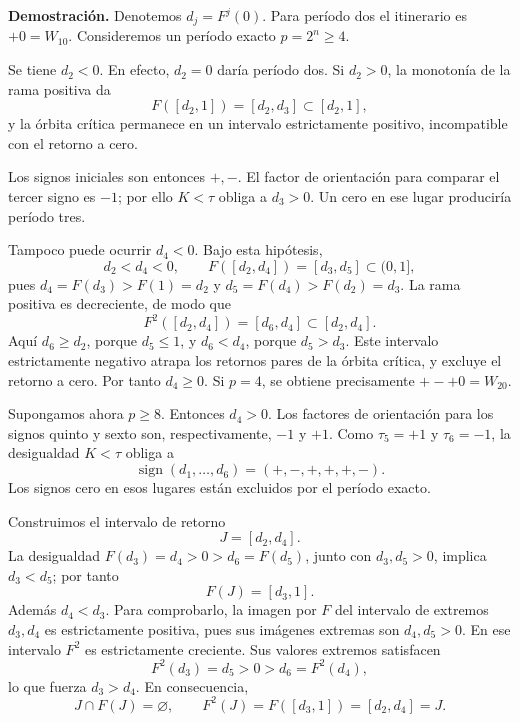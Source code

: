 \textbf{Demostración.} Denotemos \(d_j=F^j(0)\). Para período dos el itinerario es \(+0=W_10\). Consideremos un período exacto \(p=2^n\ge4\).

Se tiene \(d_2<0\). En efecto, \(d_2=0\) daría período dos. Si \(d_2>0\), la monotonía de la rama positiva da
\[
F([d_2,1])=[d_2,d_3]\subset[d_2,1],
\]
y la órbita crítica permanece en un intervalo estrictamente positivo, incompatible con el retorno a cero.

Los signos iniciales son entonces \(+,-\). El factor de orientación para comparar el tercer signo es \(-1\); por ello \(K<\tau\) obliga a \(d_3>0\). Un cero en ese lugar produciría período tres.

Tampoco puede ocurrir \(d_4<0\). Bajo esta hipótesis,
\[
d_2<d_4<0,
\qquad F([d_2,d_4])=[d_3,d_5]\subset(0,1],
\]
pues \(d_4=F(d_3)>F(1)=d_2\) y \(d_5=F(d_4)>F(d_2)=d_3\). La rama positiva es decreciente, de modo que
\[
F^2([d_2,d_4])=[d_6,d_4]\subset[d_2,d_4].
\]
Aquí \(d_6\ge d_2\), porque \(d_5\le1\), y \(d_6<d_4\), porque \(d_5>d_3\). Este intervalo estrictamente negativo atrapa los retornos pares de la órbita crítica, y excluye el retorno a cero. Por tanto \(d_4\ge0\). Si \(p=4\), se obtiene precisamente \(+-+0=W_20\).

Supongamos ahora \(p\ge8\). Entonces \(d_4>0\). Los factores de orientación para los signos quinto y sexto son, respectivamente, \(-1\) y \(+1\). Como \(\tau_5=+1\) y \(\tau_6=-1\), la desigualdad \(K<\tau\) obliga a
\begin{equation}
\operatorname{sign}(d_1,\ldots,d_6)=(+,-,+,+,+,-).
\label{hmtfg:clasificacion:eq:1}
\end{equation}
Los signos cero en esos lugares están excluidos por el período exacto.

Construimos el intervalo de retorno
\[
J=[d_2,d_4].
\]
La desigualdad \(F(d_3)=d_4>0>d_6=F(d_5)\), junto con \(d_3,d_5>0\), implica \(d_3<d_5\); por tanto
\[
F(J)=[d_3,1].
\]
Además \(d_4<d_3\). Para comprobarlo, la imagen por \(F\) del intervalo de extremos \(d_3,d_4\) es estrictamente positiva, pues sus imágenes extremas son \(d_4,d_5>0\). En ese intervalo \(F^2\) es estrictamente creciente. Sus valores extremos satisfacen
\[
F^2(d_3)=d_5>0>d_6=F^2(d_4),
\]
lo que fuerza \(d_3>d_4\). En consecuencia,
\begin{equation}
J\cap F(J)=\varnothing,
\qquad F^2(J)=F([d_3,1])=[d_2,d_4]=J.
\label{hmtfg:clasificacion:eq:2}
\end{equation}

